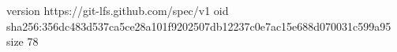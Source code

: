 version https://git-lfs.github.com/spec/v1
oid sha256:356dc483d537ca5ce28a101f9202507db12237c0e7ac15e688d070031c599a95
size 78
